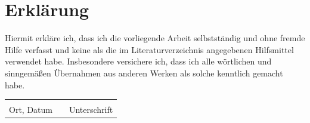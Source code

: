 \documentclass[a4paper,12pt,titlepage]{article}
\begin{document}
\section{Erklärung}
Hiermit erkläre ich, dass ich die vorliegende Arbeit selbstständig und ohne fremde Hilfe verfasst und keine als die im Literaturverzeichnis angegebenen Hilfsmittel verwendet habe. \newline
Insbesondere versichere ich, dass ich alle wörtlichen und sinngemäßen Übernahmen aus anderen Werken als solche kenntlich gemacht habe. \newline

\begin{tabular}{lp{2em}l}
 \hspace{5cm}   && \hspace{4cm} \\\cline{1-1}\cline{3-3}
 Ort, Datum     && Unterschrift
\end{tabular} 
\end{document}
